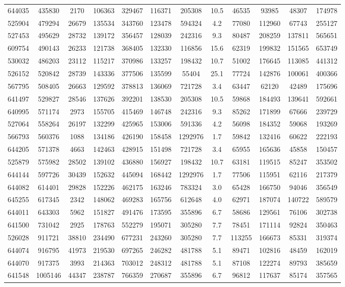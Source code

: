 \documentclass[DM,lsstdraft,toc,usenatbib]{lsstdoc}
\begin{document}
\begin{table}
\begin{tabular}{cccccccccccc}
644035 & 435830 & 2170 & 106363 & 329467 & 116371 & 205308 & 10.5 & 46535 & 93985 & 48307 & 174978 \\
525904 & 479294 & 26679 & 135534 & 343760 & 123478 & 594324 & 4.2 & 77080 & 112960 & 67743 & 255127 \\
527453 & 495629 & 28732 & 139172 & 356457 & 128039 & 242316 & 9.3 & 80487 & 208259 & 137811 & 565651 \\
609754 & 490143 & 26233 & 121738 & 368405 & 132330 & 116856 & 15.6 & 62319 & 199832 & 151565 & 653749 \\
530032 & 486203 & 23112 & 115217 & 370986 & 133257 & 198432 & 10.7 & 51002 & 176645 & 113085 & 441312 \\
526152 & 520842 & 28739 & 143336 & 377506 & 135599 & 55404 & 25.1 & 77724 & 142876 & 100061 & 400366 \\
567795 & 508405 & 26663 & 129592 & 378813 & 136069 & 721728 & 3.4 & 63447 & 62120 & 42489 & 175696 \\
641497 & 529827 & 28546 & 137626 & 392201 & 138530 & 205308 & 10.5 & 59868 & 184493 & 139641 & 592661 \\
640995 & 571174 & 2973 & 155705 & 415469 & 146748 & 242316 & 9.3 & 85262 & 171899 & 67666 & 239729 \\
527064 & 558264 & 26197 & 132299 & 425965 & 153006 & 591336 & 4.2 & 56098 & 184352 & 59068 & 193269 \\
566793 & 560376 & 1088 & 134186 & 426190 & 158458 & 1292976 & 1.7 & 59842 & 132416 & 60622 & 222193 \\
644205 & 571378 & 4663 & 142463 & 428915 & 151498 & 721728 & 3.4 & 65955 & 165636 & 45858 & 150457 \\
525879 & 575982 & 28502 & 139102 & 436880 & 156927 & 198432 & 10.7 & 63181 & 119515 & 85247 & 353502 \\
644144 & 597726 & 30439 & 152632 & 445094 & 168442 & 1292976 & 1.7 & 77506 & 115951 & 62116 & 217379 \\
644082 & 614401 & 29828 & 152226 & 462175 & 163246 & 783324 & 3.0 & 65428 & 166750 & 94046 & 356549 \\
645255 & 617345 & 2342 & 148062 & 469283 & 165756 & 612648 & 4.0 & 62971 & 187074 & 140722 & 589579 \\
644011 & 643303 & 5962 & 151827 & 491476 & 173595 & 355896 & 6.7 & 58686 & 129561 & 76106 & 302738 \\
641500 & 731042 & 2925 & 178763 & 552279 & 195071 & 305280 & 7.7 & 78451 & 171114 & 92824 & 350463 \\
526028 & 911721 & 38810 & 234490 & 677231 & 243260 & 305280 & 7.7 & 113255 & 166673 & 85331 & 319374 \\
644074 & 916795 & 41973 & 219530 & 697265 & 246282 & 481788 & 5.1 & 89471 & 102816 & 48459 & 162019 \\
644070 & 917375 & 3993 & 214363 & 703012 & 248312 & 481788 & 5.1 & 87108 & 122274 & 89793 & 385659 \\
641548 & 1005146 & 44347 & 238787 & 766359 & 270687 & 355896 & 6.7 & 96812 & 117637 & 85174 & 357565 \\

\hline
\end{tabular}
\end{table}
\end{document}
